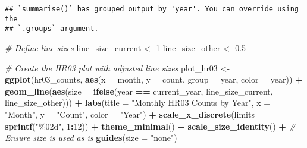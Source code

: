 \documentclass[
]{article}
\newenvironment{Shaded}{\begin{snugshade}}{\end{snugshade}}
\newcommand{\AttributeTok}[1]{\textcolor[rgb]{0.13,0.29,0.53}{#1}}
\newcommand{\CommentTok}[1]{\textcolor[rgb]{0.56,0.35,0.01}{\textit{#1}}}
\newcommand{\DecValTok}[1]{\textcolor[rgb]{0.00,0.00,0.81}{#1}}
\newcommand{\FloatTok}[1]{\textcolor[rgb]{0.00,0.00,0.81}{#1}}
\newcommand{\FunctionTok}[1]{\textcolor[rgb]{0.13,0.29,0.53}{\textbf{#1}}}
\newcommand{\NormalTok}[1]{#1}
\newcommand{\OtherTok}[1]{\textcolor[rgb]{0.56,0.35,0.01}{#1}}
\newcommand{\SpecialCharTok}[1]{\textcolor[rgb]{0.81,0.36,0.00}{\textbf{#1}}}
\newcommand{\StringTok}[1]{\textcolor[rgb]{0.31,0.60,0.02}{#1}}
\begin{document}
\begin{Shaded}
\end{Shaded}

\begin{verbatim}
## `summarise()` has grouped output by 'year'. You can override using the
## `.groups` argument.
\end{verbatim}

\begin{Shaded}
\begin{Highlighting}[]
\CommentTok{\# Define line sizes}
\NormalTok{line\_size\_current }\OtherTok{\textless{}{-}} \DecValTok{1}
\NormalTok{line\_size\_other }\OtherTok{\textless{}{-}} \FloatTok{0.5}

\CommentTok{\# Create the HR03 plot with adjusted line sizes}
\NormalTok{plot\_hr03 }\OtherTok{\textless{}{-}} \FunctionTok{ggplot}\NormalTok{(hr03\_counts, }\FunctionTok{aes}\NormalTok{(}\AttributeTok{x =}\NormalTok{ month, }\AttributeTok{y =}\NormalTok{ count, }\AttributeTok{group =}\NormalTok{ year, }\AttributeTok{color =}\NormalTok{ year)) }\SpecialCharTok{+}
  \FunctionTok{geom\_line}\NormalTok{(}\FunctionTok{aes}\NormalTok{(}\AttributeTok{size =} \FunctionTok{ifelse}\NormalTok{(year }\SpecialCharTok{==}\NormalTok{ current\_year, line\_size\_current, line\_size\_other))) }\SpecialCharTok{+}
  \FunctionTok{labs}\NormalTok{(}\AttributeTok{title =} \StringTok{"Monthly HR03 Counts by Year"}\NormalTok{,}
       \AttributeTok{x =} \StringTok{"Month"}\NormalTok{,}
       \AttributeTok{y =} \StringTok{"Count"}\NormalTok{,}
       \AttributeTok{color =} \StringTok{"Year"}\NormalTok{) }\SpecialCharTok{+}
  \FunctionTok{scale\_x\_discrete}\NormalTok{(}\AttributeTok{limits =} \FunctionTok{sprintf}\NormalTok{(}\StringTok{"\%02d"}\NormalTok{, }\DecValTok{1}\SpecialCharTok{:}\DecValTok{12}\NormalTok{)) }\SpecialCharTok{+}
  \FunctionTok{theme\_minimal}\NormalTok{() }\SpecialCharTok{+}
  \FunctionTok{scale\_size\_identity}\NormalTok{() }\SpecialCharTok{+}  \CommentTok{\# Ensure size is used as is}
  \FunctionTok{guides}\NormalTok{(}\AttributeTok{size =} \StringTok{"none"}\NormalTok{)}
\end{Highlighting}
\end{Shaded}
\end{document}
